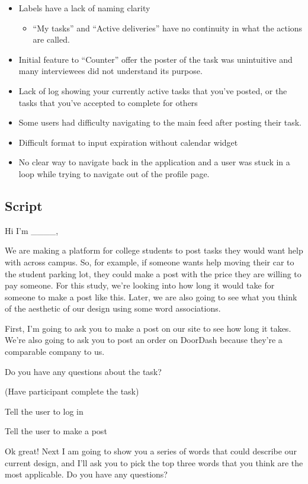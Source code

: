 \begin{itemize}
\item Labels have a lack of naming clarity
\begin{itemize}
\item “My tasks” and “Active deliveries” have no continuity in what the actions are called.
\end{itemize}
\item Initial feature to “Counter” offer the poster of the task was unintuitive and many interviewees did not understand its purpose.
\item Lack of log showing your currently active tasks that you've posted, or the tasks that you've accepted to complete for others
\item Some users had difficulty navigating to the main feed after posting their task.
\item Difficult format to input expiration without calendar widget
\item No clear way to navigate back in the application and a user was stuck in a loop while trying to navigate out of the profile page.
\end{itemize}


\subsection{Script}

Hi I’m \_\_\_\_, 

We are making a platform for college students to post tasks they would want help with across campus. So, for example, if someone wants help moving their car to the student parking lot, they could make a post with the price they are willing to pay someone. For this study, we’re looking into how long it would take for someone to make a post like this. Later, we are also going to see what you think of the aesthetic of our design using some word associations.

First, I’m going to ask you to make a post on our site to see how long it takes. We’re also going to ask you to post an order on DoorDash because they’re a comparable company to us.

Do you have any questions about the task?

(Have participant complete the task)

Tell the user to log in 

Tell the user to make a post 

Ok great! Next I am going to show you a series of words that could describe our current design, and I’ll ask you to pick the top three words that you think are the most applicable. Do you have any questions?

